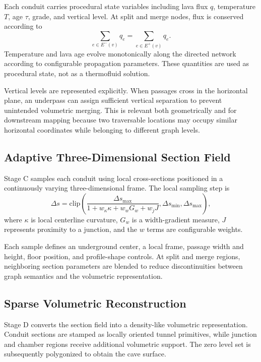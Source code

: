 \documentclass[conference]{IEEEtran}
\begin{document}
Each conduit carries procedural state variables including lava flux $q$, temperature $T$, age $\tau$, grade, and vertical level. At split and merge nodes, flux is conserved according to
\begin{equation}
\sum_{e\in E^{-}(v)}q_e=\sum_{e\in E^{+}(v)}q_e.
\label{eq:flux}
\end{equation}
Temperature and lava age evolve monotonically along the directed network according to configurable propagation parameters. These quantities are used as procedural state, not as a thermofluid solution.

Vertical levels are represented explicitly. When passages cross in the horizontal plane, an underpass can assign sufficient vertical separation to prevent unintended volumetric merging. This is relevant both geometrically and for downstream mapping because two traversable locations may occupy similar horizontal coordinates while belonging to different graph levels.

\subsection{Adaptive Three-Dimensional Section Field}

Stage C samples each conduit using local cross-sections positioned in a continuously varying three-dimensional frame. The local sampling step is
\begin{equation}
\Delta s=\mathrm{clip}\left(\frac{\Delta s_{\max}}{1+w_{\kappa}\kappa+w_wG_w+w_jJ},\Delta s_{\min},\Delta s_{\max}\right),
\label{eq:adaptive}
\end{equation}
where $\kappa$ is local centerline curvature, $G_w$ is a width-gradient measure, $J$ represents proximity to a junction, and the $w$ terms are configurable weights.

Each sample defines an underground center, a local frame, passage width and height, floor position, and profile-shape controls. At split and merge regions, neighboring section parameters are blended to reduce discontinuities between graph semantics and the volumetric representation.

\subsection{Sparse Volumetric Reconstruction}

Stage D converts the section field into a density-like volumetric representation. Conduit sections are stamped as locally oriented tunnel primitives, while junction and chamber regions receive additional volumetric support. The zero level set is subsequently polygonized to obtain the cave surface.
\end{document}
